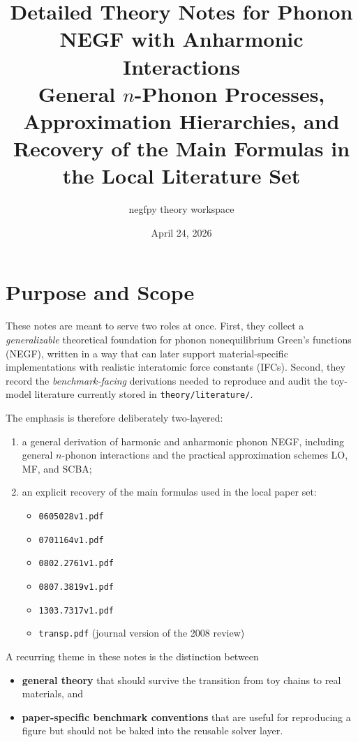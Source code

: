 \documentclass[11pt]{article}
\title{Detailed Theory Notes for Phonon NEGF with Anharmonic Interactions\\\large General \texorpdfstring{$n$}{n}-Phonon Processes, Approximation Hierarchies, and Recovery of the Main Formulas in the Local Literature Set}
\author{negfpy theory workspace}
\date{April 24, 2026}
\begin{document}
\maketitle
\tableofcontents
\newpage

\section*{Purpose and Scope}
These notes are meant to serve two roles at once.
First, they collect a \emph{generalizable} theoretical foundation for phonon nonequilibrium Green's functions (NEGF), written in a way that can later support material-specific implementations with realistic interatomic force constants (IFCs). Second, they record the \emph{benchmark-facing} derivations needed to reproduce and audit the toy-model literature currently stored in \texttt{theory/literature/}.

The emphasis is therefore deliberately two-layered:
\begin{enumerate}[label=\arabic*.]
\item a general derivation of harmonic and anharmonic phonon NEGF, including general $n$-phonon interactions and the practical approximation schemes LO, MF, and SCBA;
\item an explicit recovery of the main formulas used in the local paper set:
\begin{itemize}
\item \texttt{0605028v1.pdf}
\item \texttt{0701164v1.pdf}
\item \texttt{0802.2761v1.pdf}
\item \texttt{0807.3819v1.pdf}
\item \texttt{1303.7317v1.pdf}
\item \texttt{transp.pdf} (journal version of the 2008 review)
\end{itemize}
\end{enumerate}

A recurring theme in these notes is the distinction between
\begin{itemize}
\item \textbf{general theory} that should survive the transition from toy chains to real materials, and
\item \textbf{paper-specific benchmark conventions} that are useful for reproducing a figure but should not be baked into the reusable solver layer.
\end{itemize}





\end{document}
